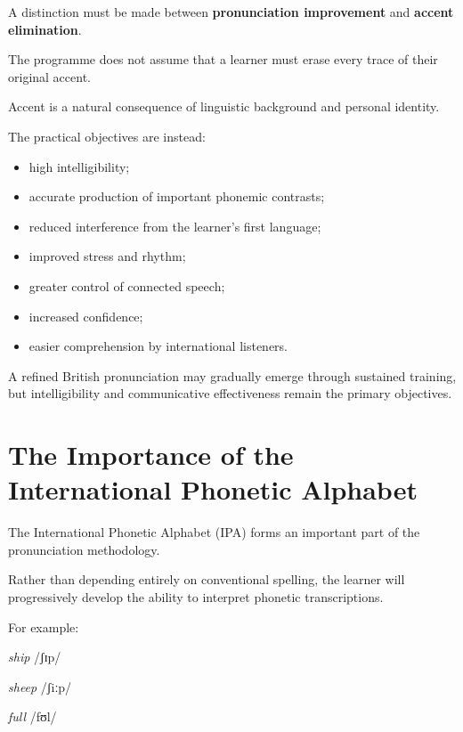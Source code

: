 A distinction must be made between \textbf{pronunciation improvement} and \textbf{accent elimination}.

The programme does not assume that a learner must erase every trace of their original accent.

Accent is a natural consequence of linguistic background and personal identity.

The practical objectives are instead:

\begin{itemize}
    \item high intelligibility;
    \item accurate production of important phonemic contrasts;
    \item reduced interference from the learner's first language;
    \item improved stress and rhythm;
    \item greater control of connected speech;
    \item increased confidence;
    \item easier comprehension by international listeners.
\end{itemize}

A refined British pronunciation may gradually emerge through sustained training, but intelligibility and communicative effectiveness remain the primary objectives.

\section*{The Importance of the International Phonetic Alphabet}

The International Phonetic Alphabet (IPA) forms an important part of the pronunciation methodology.

Rather than depending entirely on conventional spelling, the learner will progressively develop the ability to interpret phonetic transcriptions.

For example:

\begin{center}
\textit{ship} /ʃɪp/
\end{center}

\begin{center}
\textit{sheep} /ʃiːp/
\end{center}

\begin{center}
\textit{full} /fʊl/
\end{center}

